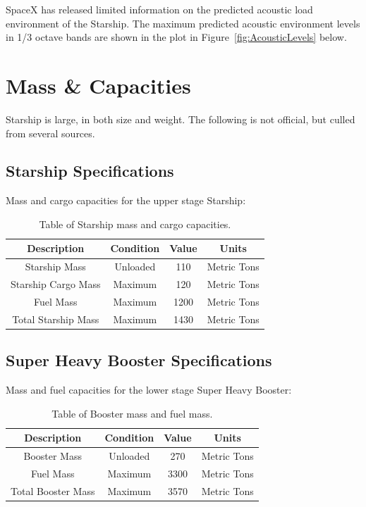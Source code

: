 \documentclass[11pt]{article}
\begin{document}
SpaceX has released limited information on the predicted acoustic load environment of the Starship. The maximum predicted acoustic environment levels in 1/3 octave bands are shown in the plot in Figure~\ref{fig:AcousticLevels} below.

\section{Mass \& Capacities}

Starship is large, in both size and weight. The following is not official, but culled from several sources.


\subsection{Starship Specifications}

Mass and cargo capacities for the upper stage Starship:
\newline

\begin{table}[H]
\begin{center}
\caption{\label{StarshipMassSpecs02}Table of Starship mass and cargo capacities.}
\begin{tabular}{||c c c c||} 
 \hline
 Description & Condition & Value & Units \\ [0.5ex]
 \hline\hline
 Starship Mass & Unloaded & 110 & Metric Tons \\ 
 \hline
 Starship Cargo Mass & Maximum & 120 & Metric Tons \\
 \hline
 Fuel Mass & Maximum & 1200 & Metric Tons \\
 \hline
 Total Starship Mass & Maximum & 1430 & Metric Tons \\
 \hline
\end{tabular}
\end{center}
\end{table}

\subsection{Super Heavy Booster Specifications}

Mass and fuel capacities for the lower stage Super Heavy Booster: 


\begin{table}[H]
\begin{center}
\caption{\label{BoosterMassSpecs}Table of Booster mass and fuel mass.}
\begin{tabular}{||c c c c||} 
 \hline
 Description & Condition & Value & Units \\ [0.5ex]
 \hline\hline
 Booster Mass & Unloaded & 270 & Metric Tons \\ 
 \hline
 Fuel Mass & Maximum & 3300 & Metric Tons \\
 \hline
 Total Booster Mass & Maximum & 3570 & Metric Tons \\
 \hline
\end{tabular}
\end{center}
\end{table} 
\end{document}
